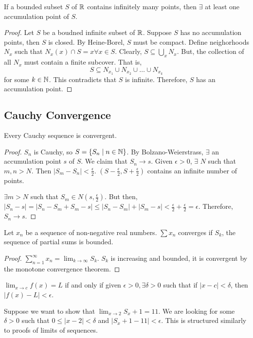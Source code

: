 \begin{theorem}
    If a bounded subset $S$ of $\mathbb{R}$ contains infinitely many points, then $\exists$ at least one accumulation point of $S$.
\end{theorem}
\begin{proof}
    Let $S$ be a boudned infinite subset of $\mathbb{R}$. Suppose $S$ has no accumulation points, then $S$ is closed. By Heine-Borel, $S$ must be compact. Define neighorhoods $N_x$ such that $N_x(x) \cap S = {x} \forall x \in S$. Clearly, $S \subseteq \bigcup_x N_x$. But, the collection of all $N_x$ must contain a finite subcover. That is, $$S \subseteq N_{x_1} \cup N_{x_2} \cup \ldots \cup N_{x_k}$$ for some $k \in \mathbb{N}$. This contradicts that $S$ is infinite. Therefore, $S$ has an accumulation point.
\end{proof}

\subsection{Cauchy Convergence}
\begin{theorem}
    Every Cauchy sequence is convergent.
\end{theorem}
\begin{proof}
    $S_n$ is Cauchy, so $S = \{S_n \mid n \in \mathbb{N}\}$. By Bolzano-Weierstrass, $\exists$ an accumulation point $s$ of $S$. We claim that $S_n \rightarrow s$. Given $\epsilon > 0$, $\exists$ $N$ such that $m, n > N$. Then $|S_m - S_n| < \frac{\epsilon}{2}$. $(S - \frac{\epsilon}{2}, S + \frac{\epsilon}{2})$ contains an infinite number of points. 
    
    $\exists m > N$ such that $S_m \in N(s, \frac{\epsilon}{2})$. But then, $|S_n - s| = |S_n - S_m + S_m - s| \leq |S_n - S_m| + |S_m - s| < \frac{\epsilon}{2} + \frac{\epsilon}{2} = \epsilon$. Therefore, $S_n \rightarrow s$.
\end{proof}

\begin{theorem}
    Let $x_n$ be a sequence of non-negative real numbers. $\sum x_n$ converges if $S_k$, the sequence of partial sums is bounded.
\end{theorem}
\begin{proof}
    $\sum_{n=1}^\infty x_n = \lim_{k \to \infty} S_k$. $S_k$ is increasing and bounded, it is convergent by the monotone convergence theorem.
\end{proof}

\begin{definition}
    $\lim_{x \to c} f(x) = L$ if and only if given $\epsilon > 0, \exists \delta > 0$ such that if $|x - c| < \delta$, then $|f(x) - L| < \epsilon$.
\end{definition}
\begin{remark}
    Suppose we want to show that $\lim_{x \to 2} S_x + 1 = 11$. We are looking for some $\delta > 0$ such that $0 \leq |x  - 2| < \delta$ and $|S_x + 1 - 11| < \epsilon$. This is structured similarly to proofs of limits of sequences.
\end{remark}